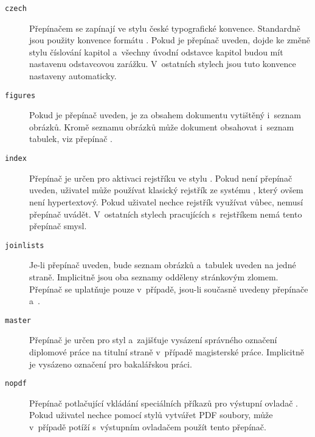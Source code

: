 \documentclass[12pt]{article}
\begin{document}
\begin{description}

\item[{\tt czech}]
  Přepínačem  se zapínají ve stylu  české 
  typografické konvence. Standardně jsou použity konvence formátu \LaTeXE.
  Pokud je přepínač uveden, dojde ke změně stylu číslování kapitol a~všechny
  úvodní odstavce kapitol budou mít nastavenu odstavcovou zarážku.
  V~ostatních stylech jsou tuto konvence nastaveny automaticky.


\item[{\tt figures}]
  Pokud je přepínač uveden, je za obsahem dokumentu vytištěný i~seznam
  obrázků. Kromě seznamu obrázků může dokument obsahovat i~seznam tabulek,
  viz přepínač .

\item[{\tt index}]
  Přepínač je určen pro aktivaci rejstříku ve stylu . 
  Pokud není přepínač uveden, uživatel může používat
  klasický rejstřík ze systému \LaTeXE, který ovšem není hypertextový. Pokud
  uživatel nechce rejstřík využívat vůbec, nemusí přepínač uvádět.
  V~ostatních stylech pracujících s~rejstříkem nemá tento přepínač smysl.

\item[{\tt joinlists}]
  Je-li přepínač uveden, bude seznam obrázků a~tabulek uveden na jedné 
  straně. Implicitně jsou oba seznamy odděleny stránkovým zlomem. 
  Přepínač se uplatňuje pouze v~případě, jsou-li současně uvedeny 
  přepínače  a~.

\item[{\tt master}]
  Přepínač je určen pro styl  a~zajišťuje vysázení
  správného označení diplomové práce na titulní straně v~případě
  magisterské práce. Implicitně je vysázeno označení pro bakalářskou
  práci.

\item[{\tt nopdf}]
  Přepínač potlačující vkládání speciálních příkazů pro výstupní ovladač
  . Pokud uživatel nechce pomocí stylů vytvářet PDF soubory,
  může v~případě potíží s~výstupním ovladačem použít tento přepínač.


\end{description}
\end{document}
